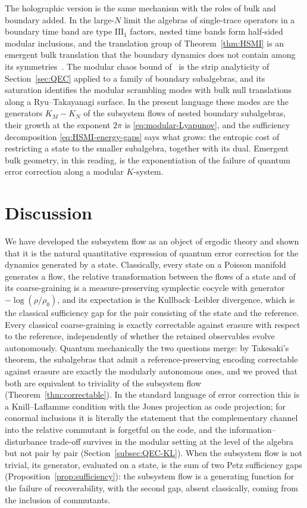 \documentclass[a4paper,11pt]{article}
\theoremstyle{definition}
\begin{document}
The holographic version is the same mechanism with the roles of bulk and boundary added. In the large-$N$ limit the algebras of single-trace operators in a boundary time band are type $\mathrm{III}_1$ factors, nested time bands form half-sided modular inclusions, and the translation group of Theorem~\ref{thm:HSMI} is an emergent bulk translation that the boundary dynamics does not contain among its symmetries~\cite{LeutheusserLiu2023}. The modular chaos bound of~\cite{deBoerLamprou2020} is the strip analyticity of Section~\ref{sec:QEC} applied to a family of boundary subalgebras, and its saturation identifies the modular scrambling modes with bulk null translations along a Ryu--Takayanagi surface. In the present language these modes are the generators $K_M-K_N$ of the subsystem flows of nested boundary subalgebras, their growth at the exponent $2\pi$ is \eqref{eq:modular-Lyapunov}, and the sufficiency decomposition \eqref{eq:HSMI-energy-gaps} says what grows: the entropic cost of restricting a state to the smaller subalgebra, together with its dual. Emergent bulk geometry, in this reading, is the exponentiation of the failure of quantum error correction along a modular $K$-system.


\section{Discussion}\label{sec:discussion}

We have developed the subsystem flow as an object of ergodic theory and shown that it is the natural quantitative expression of quantum error correction for the dynamics generated by a state. Classically, every state on a Poisson manifold generates a flow, the relative transformation between the flows of a state and of its coarse-graining is a measure-preserving symplectic cocycle with generator $-\log(\rho/\rho_0)$, and its expectation is the Kullback--Leibler divergence, which is the classical sufficiency gap for the pair consisting of the state and the reference. Every classical coarse-graining is exactly correctable against erasure with respect to the reference, independently of whether the retained observables evolve autonomously. Quantum mechanically the two questions merge: by Takesaki's theorem, the subalgebras that admit a reference-preserving encoding correctable against erasure are exactly the modularly autonomous ones, and we proved that both are equivalent to triviality of the subsystem flow (Theorem~\ref{thm:correctable}). In the standard language of error correction this is a Knill--Laflamme condition with the Jones projection as code projection; for conormal inclusions it is literally the statement that the complementary channel into the relative commutant is forgetful on the code, and the information--disturbance trade-off survives in the modular setting at the level of the algebra but not pair by pair (Section~\ref{subsec:QEC-KL}). When the subsystem flow is not trivial, its generator, evaluated on a state, is the sum of two Petz sufficiency gaps (Proposition~\ref{prop:sufficiency}): the subsystem flow is a generating function for the failure of recoverability, with the second gap, absent classically, coming from the inclusion of commutants.
\end{document}
